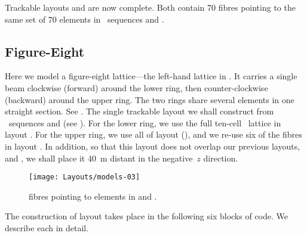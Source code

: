 Trackable layouts  and  are now complete.
Both contain 70 fibres pointing to the same set of 70 elements
in \DNA\ sequences  and .


\subsection{Figure-Eight}

%
Here we model a figure-eight lattice---the left-hand lattice in
. It carries a single beam clockwise (forward)
around the lower ring, then counter-clockwise (backward) around
the upper ring. The two rings share several elements in one
straight section. See . The single trackable
layout  we shall construct from \DNA\ sequences 
and  (see ). For the lower ring, we use
the full ten-cell \PSR\ lattice in layout . For the upper
ring, we use all of layout  (), and we
re-use six of the fibres in layout . In addition, so that
this layout does not overlap our previous layouts,  and
, we shall place it \SI{40}{m} distant in the negative~$z$
direction.

\begin{figure}[ht]
  \centering
  \texttt{[image: Layouts/models-03]}
  \caption{ fibres pointing to elements in 
           and .}
  \label{fig:accel.fig8}
\end{figure}

The construction of layout  takes place in the following
six blocks of code. We describe each in detail.

